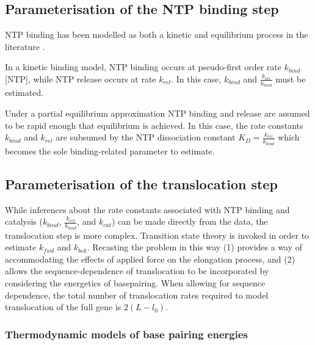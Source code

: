 \documentclass[10pt,letterpaper]{article}
\begin{document}
\subsection*{Parameterisation of the NTP binding step}





NTP binding has been modelled as both a kinetic and equilibrium process in the literature \cite{bai2004sequence, abbondanzieri2005direct, maoileidigh2011unified}.

In a kinetic binding model, NTP binding occurs at pseudo-first order rate $k_{bind}$[NTP], while NTP release occurs at rate $k_{rel}$. In this case, $k_{bind}$ and $\frac{k_{rel}}{k_{bind}}$ must be estimated.

Under a partial equilibrium approximation NTP binding and release are assumed to be rapid enough that equilibrium is achieved. In this case, the rate constants $k_{bind}$ and $k_{rel}$ are subsumed by the NTP dissociation constant $K_D = \frac{k_{rel}}{k_{bind}}$ which becomes the sole binding-related parameter to estimate.



\subsection*{Parameterisation of the translocation step}





While inferences about the rate constants associated with NTP binding and catalysis ($k_{bind}$, $\frac{k_{rel}}{k_{bind}}$, and $k_{cat}$) can be made directly from the data, the translocation step is more complex. Transition state theory is invoked in order to estimate $k_{fwd}$ and $k_{bck}$. Recasting the problem in this way (1) provides a way of accommodating the effects of applied force on the elongation process, and (2) allows the sequence-dependence of translocation to be incorporated by considering the energetics of basepairing. When allowing for sequence dependence, the total number of translocation rates required to model translocation of the full gene is $2(L - l_0)$.




\subsubsection*{Thermodynamic models of base pairing energies}
\end{document}
